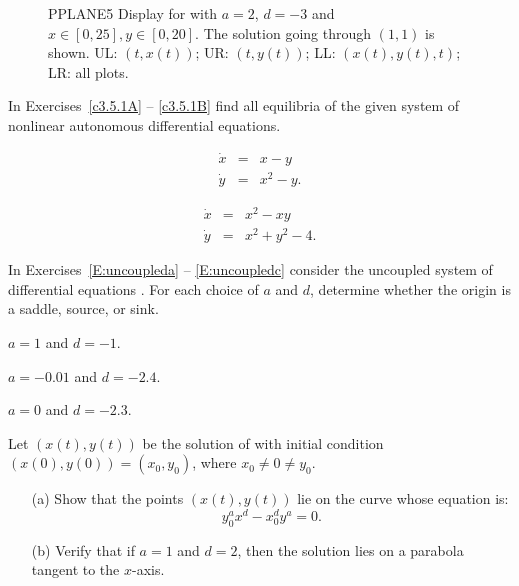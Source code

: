 \begin{figure}[htb]
     \centerline{%
     }
     \centerline{%
     }
     \caption{{\sf PPLANE5 Display} for \protect{} with
             $a=2$, $d=-3$ and $x\in [0,25], y\in [0,20]$. The solution
             going through $(1,1)$ is shown. UL: $(t,x(t))$;
	UR: $(t,y(t))$; LL: $(x(t),y(t),t)$; LR: all plots.}
     \label{plotall}
\end{figure}


\EXER

\TEXER

\noindent In Exercises~\ref{c3.5.1A} -- \ref{c3.5.1B} find all equilibria of
the given system of nonlinear autonomous differential equations.
\begin{exercise}  \label{c3.5.1A}
\begin{eqnarray*}
\dot{x} & = & x - y\\
\dot{y} & = & x^2 - y.
\end{eqnarray*}
\end{exercise}
\begin{exercise}  \label{c3.5.1B}
\begin{eqnarray*}
\dot{x} & = & x^2 - xy\\
\dot{y} & = & x^2 + y^2 - 4.
\end{eqnarray*}
\end{exercise}


\noindent In Exercises~\ref{E:uncoupleda} -- \ref{E:uncoupledc}
consider the uncoupled system of differential equations .
For each choice of $a$ and $d$, determine whether the origin is a
saddle, source, or sink.
\begin{exercise} \label{E:uncoupleda}
$a=1$ and $d=-1$.
\end{exercise}
\begin{exercise} \label{E:uncoupledb}
$a=-0.01$ and $d=-2.4$.
\end{exercise}
\begin{exercise} \label{E:uncoupledc}
$a=0$ and $d=-2.3$.
\end{exercise}

\begin{exercise} \label{c3.4.2}
Let $(x(t),y(t))$ be the solution  of 
with initial condition $(x(0),y(0))=(x_0,y_0)$, where $x_0\neq 0 \neq y_0$.
\begin{itemize}
\item[(a)] Show that the points $(x(t),y(t))$ lie on the curve whose 
equation is:
\[
y_0^ax^d - x_0^dy^a = 0.
\]
\item[(b)] Verify that if $a=1$ and $d=2$, then the solution lies
on a parabola tangent to the $x$-axis.
\end{itemize}
\end{exercise}

